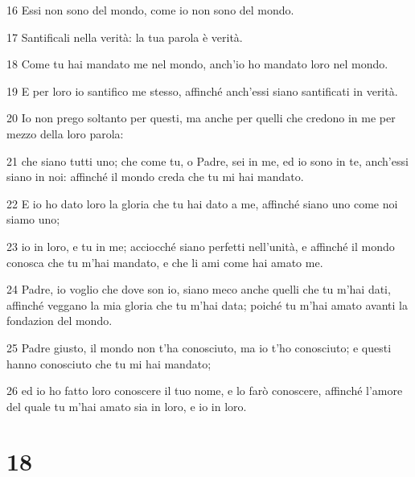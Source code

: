 \par 16 Essi non sono del mondo, come io non sono del mondo.
\par 17 Santificali nella verità: la tua parola è verità.
\par 18 Come tu hai mandato me nel mondo, anch'io ho mandato loro nel mondo.
\par 19 E per loro io santifico me stesso, affinché anch'essi siano santificati in verità.
\par 20 Io non prego soltanto per questi, ma anche per quelli che credono in me per mezzo della loro parola:
\par 21 che siano tutti uno; che come tu, o Padre, sei in me, ed io sono in te, anch'essi siano in noi: affinché il mondo creda che tu mi hai mandato.
\par 22 E io ho dato loro la gloria che tu hai dato a me, affinché siano uno come noi siamo uno;
\par 23 io in loro, e tu in me; acciocché siano perfetti nell'unità, e affinché il mondo conosca che tu m'hai mandato, e che li ami come hai amato me.
\par 24 Padre, io voglio che dove son io, siano meco anche quelli che tu m'hai dati, affinché veggano la mia gloria che tu m'hai data; poiché tu m'hai amato avanti la fondazion del mondo.
\par 25 Padre giusto, il mondo non t'ha conosciuto, ma io t'ho conosciuto; e questi hanno conosciuto che tu mi hai mandato;
\par 26 ed io ho fatto loro conoscere il tuo nome, e lo farò conoscere, affinché l'amore del quale tu m'hai amato sia in loro, e io in loro.

\chapter{18}

